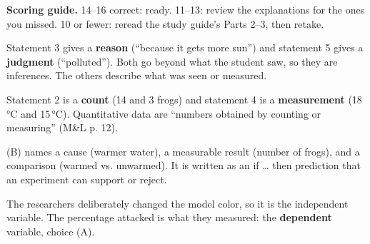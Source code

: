 \documentclass[11pt,letterpaper]{article}
\begin{document}
\textbf{Scoring guide.} 14–16 correct: ready. 11–13: review the explanations for the ones you missed. 10 or fewer: reread the study guide's Parts 2–3, then retake.


Statement 3 gives a \textbf{reason} (``because it gets more sun'') and statement 5 gives a \textbf{judgment} (``polluted''). Both go beyond what the student saw, so they are inferences. The others describe what was seen or measured.
\begin{whynot}
\end{whynot}

Statement 2 is a \textbf{count} (14 and 3 frogs) and statement 4 is a \textbf{measurement} (18\,°C and 15\,°C). Quantitative data are ``numbers obtained by counting or measuring'' (M\&L p. 12).
\begin{whynot}
\end{whynot}

(B) names a cause (warmer water), a measurable result (number of frogs), and a comparison (warmed vs. unwarmed). It is written as an if \dots{} then prediction that an experiment can support or reject.
\begin{whynot}
\end{whynot}

The researchers deliberately changed the model color, so it is the independent variable. The percentage attacked is what they measured: the \textbf{dependent} variable, choice (A).
\begin{whynot}
\end{whynot}
\end{document}
